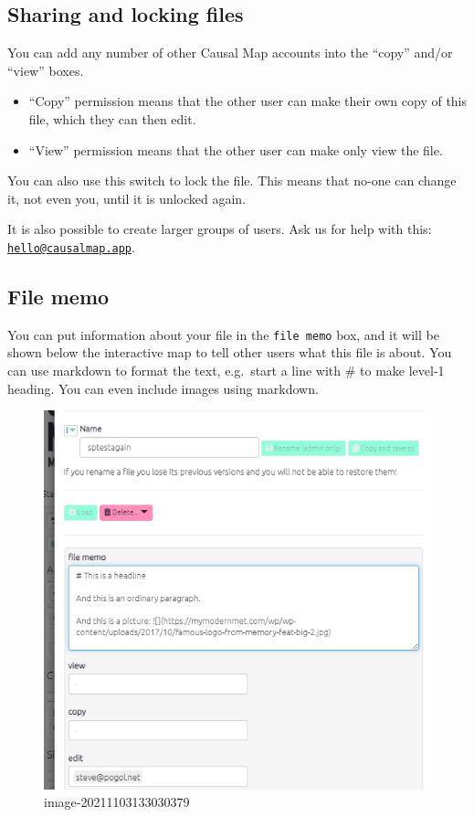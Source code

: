 \documentclass[
]{book}
\begin{document}
\hypertarget{sharing-and-locking-files}{%
\subsection{Sharing and locking files}\label{sharing-and-locking-files}}

You can add any number of other Causal Map accounts into the ``copy'' and/or ``view'' boxes.

\begin{itemize}
\item
  ``Copy'' permission means that the other user can make their own copy of this file, which they can then edit.
\item
  ``View'' permission means that the other user can make only view the file.
\end{itemize}

You can also use this switch to lock the file. This means that no-one can change it, not even you, until it is unlocked again.

It is also possible to create larger groups of users. Ask us for help with this: \href{mailto:hello@causalmap.app}{\nolinkurl{hello@causalmap.app}}.

\hypertarget{file-memo}{%
\subsection{File memo}\label{file-memo}}

You can put information about your file in the \texttt{file\ memo} box, and it will be shown below the interactive map to tell other users what this file is about. You can use markdown to format the text, e.g.~start a line with \# to make level-1 heading. You can even include images using markdown.

\begin{figure}
\centering
\includegraphics{_assets/image-20211103133030379.png}
\caption{image-20211103133030379}
\end{figure}
\end{document}
